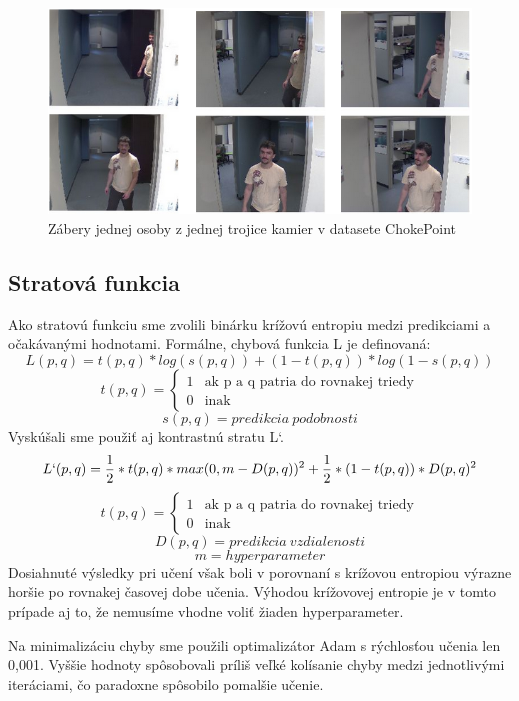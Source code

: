 \begin{figure}[H]
\centerline{\includegraphics[width=1\textwidth]{images/chokepoint_same}}
\caption[Ukážka datasetu]{Zábery jednej osoby z jednej trojice kamier v datasete ChokePoint}
\label{obr:choke_same}
\end{figure}

\subsection{Stratová funkcia}
Ako stratovú funkciu sme zvolili binárku krížovú entropiu medzi predikciami a očakávanými hodnotami.
Formálne, chybová funkcia L je definovaná:
$$L(p, q) = t(p, q) * log(s(p, q)) + (1 - t(p, q)) * log(1 - s(p, q))$$
\[
  t(p, q) =
  \begin{cases}
    1 & \text{ak p a q patria do rovnakej triedy} \\
    0 & \text{inak}
  \end{cases}
\]
$$s(p, q) = predikcia\ podobnosti$$
Vyskúšali sme použiť aj kontrastnú stratu L`.
$$L`(p, q) = \frac{1}{2} * t(p, q) * max(0, m - D(p, q))^2 + \frac{1}{2}*(1 - t(p, q)) * D(p, q)^2$$
\[
  t(p, q) =
  \begin{cases}
    1 & \text{ak p a q patria do rovnakej triedy} \\
    0 & \text{inak}
  \end{cases}
\]
$$D(p, q) = predikcia\ vzdialenosti$$
$$m = hyperparameter$$
Dosiahnuté výsledky pri učení však boli v porovnaní s krížovou entropiou výrazne horšie po rovnakej časovej dobe učenia.
Výhodou krížovovej entropie je v tomto prípade aj to, že nemusíme vhodne voliť žiaden hyperparameter.

Na minimalizáciu chyby sme použili optimalizátor Adam s rýchlosťou učenia len 0,001.
Vyššie hodnoty spôsobovali príliš veľké kolísanie chyby medzi jednotlivými iteráciami, čo paradoxne spôsobilo pomalšie učenie.

